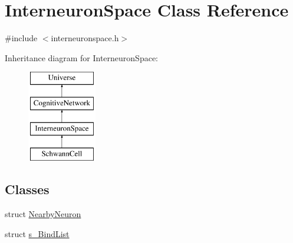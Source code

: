 \hypertarget{classInterneuronSpace}{}\section{Interneuron\+Space Class Reference}
\label{classInterneuronSpace}


{\ttfamily \#include $<$interneuronspace.\+h$>$}

Inheritance diagram for Interneuron\+Space\+:\begin{figure}[H]
\begin{center}
\leavevmode
\includegraphics[height=4.000000cm]{classInterneuronSpace}
\end{center}
\end{figure}
\subsection*{Classes}
\begin{DoxyCompactItemize}
\item 
struct \mbox{\hyperlink{structInterneuronSpace_1_1NearbyNeuron}{Nearby\+Neuron}}
\item 
struct \mbox{\hyperlink{structInterneuronSpace_1_1s__BindList}{s\+\_\+\+Bind\+List}}
\end{DoxyCompactItemize}
